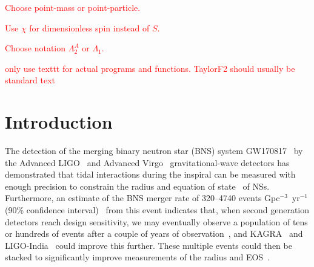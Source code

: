 \documentclass[prd,aps,letter,twocolumn,floatfix,notitlepage,nofootinbib]{revtex4-1}
\newcommand{\red}[1]{\textcolor{red}{#1}}
\begin{document}
\red{Choose point-mass or point-particle.}

\red{Use $\chi$ for dimensionless spin instead of $S$.}

\red{Choose notation $\Lambda_2^A$ or $\Lambda_1$.}

\red{only use texttt for actual programs and functions. TaylorF2 should usually be standard text}

\section{Introduction}



The detection of the merging binary neutron star (BNS) system GW170817~\cite{GW170817} by the Advanced LIGO~\cite{Harry2010} and Advanced Virgo~\cite{Acernese2009} gravitational-wave detectors has demonstrated that tidal interactions during the inspiral can be measured with enough precision to constrain the radius and equation of state~\cite{RaithelOzelPsaltis2018, DeFinstadLattimer2018, BNSPE, EOSPaper} of NSs. Furthermore, an estimate of the BNS merger rate of 320--4740 events Gpc$^{-3}$~yr$^{-1}$ (90\% confidence interval)~\cite{GW170817} from this event indicates that, when second generation detectors reach design sensitivity, we may eventually observe a population of tens or hundreds of events after a couple of years of observation~\cite{LIGORate2010}, and KAGRA~\cite{Somiya2012} and LIGO-India~\cite{IyerSouradeepUnnikrishnan2011} could improve this further. These multiple events could then be stacked to significantly improve measurements of the radius and EOS~\cite{DelPozzoLiAgathos2013, LackeyWade2015}. 
\end{document}
